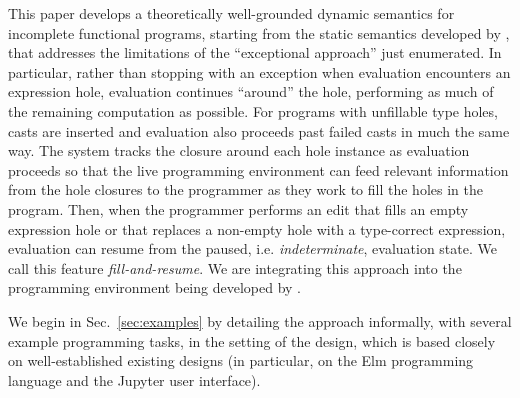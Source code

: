 
This paper develops a theoretically well-grounded dynamic semantics for incomplete functional programs, starting from the static semantics developed by \citet{popl-paper},  that addresses the limitations of the ``exceptional approach'' just enumerated. 
In particular, rather than stopping with an exception when evaluation encounters an expression hole, evaluation continues ``around'' the hole, performing as much of the remaining computation as possible. 
For programs with unfillable type holes, casts are inserted and evaluation also proceeds past failed casts in much the same way. 
The system tracks the closure around each hole instance as evaluation proceeds so that 
the live programming environment can feed relevant information from the {hole closures} to the programmer as they work to fill the holes in the program. 
Then, when the programmer performs an edit that fills an empty expression hole or that replaces a non-empty hole with a type-correct expression, evaluation can resume from the paused, i.e. \emph{indeterminate}, evaluation state. We call this feature \emph{fill-and-resume}. We are integrating this approach into the \Hazel programming environment being developed by \citet{HazelnutSNAPL}. 


\newcommand{\contribution}[2]{\paragraph{#1. #2}} 


We begin in Sec.~\ref{sec:examples} by detailing the approach informally, with several example programming tasks, in the setting of the \Hazel design, which is based closely on well-established existing designs (in particular, on the Elm programming language and the Jupyter user interface). 

